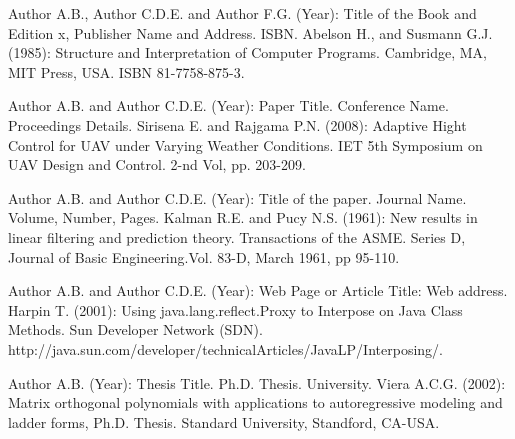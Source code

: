 \documentclass[a4paper,12pt]{report}
\begin{document}


\renewcommand{\thepage}{\roman{page}} %




\renewcommand{\thepage}{\arabic{page}} %
\setcounter{page}{1} %


 



\newpage{}

\begin{thebibliography}{5}

 Author A.B., Author C.D.E. and Author F.G. (Year): Title of the Book and Edition x, Publisher Name and Address. ISBN.  
 Abelson H., and Susmann G.J. (1985): Structure and Interpretation of Computer Programs. Cambridge, MA, MIT Press, USA. ISBN 81-7758-875-3.  

 Author A.B. and Author C.D.E. (Year): Paper Title. Conference Name. Proceedings Details.
 Sirisena E. and Rajgama P.N. (2008): Adaptive Hight Control for UAV under Varying Weather Conditions. IET 5th Symposium on UAV Design and Control. 2-nd Vol, pp. 203-209.

 Author A.B. and Author C.D.E. (Year): Title of the paper.
Journal Name. Volume, Number, Pages.
 Kalman R.E. and Pucy N.S. (1961): New results in linear filtering and prediction theory.
Transactions of the ASME. Series D, Journal of Basic Engineering.Vol. 83-D, March 1961, pp 95-110.

 Author  A.B. and Author C.D.E. (Year): Web Page or Article Title: Web address.
 Harpin T. (2001): Using java.lang.reflect.Proxy to Interpose on Java Class Methods. Sun Developer Network (SDN). http://java.sun.com/developer/technicalArticles/JavaLP/Interposing/.

 Author A.B. (Year): Thesis Title. Ph.D. Thesis. University.
 Viera A.C.G. (2002): Matrix orthogonal polynomials with applications to autoregressive
modeling and ladder forms, Ph.D. Thesis. Standard University, Standford, CA-USA.
 
\end{thebibliography}

\end{document}
